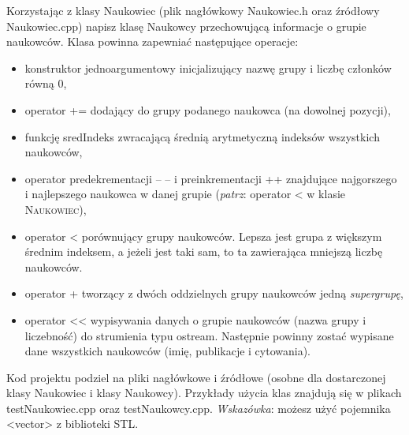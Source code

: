 \documentclass[12pt]{article}
\begin{document}
Korzystając z klasy \textsf{Naukowiec} (plik nagłówkowy \textsf{Naukowiec.h} oraz źródłowy \textsf{Naukowiec.cpp}) napisz klasę \textsf{Naukowcy} przechowującą informacje o grupie naukowców. Klasa powinna zapewniać następujące operacje:
\begin{itemize}
\item konstruktor jednoargumentowy inicjalizujący nazwę grupy i liczbę członków równą 0,
\item operator \textsf{+=} dodający do grupy podanego naukowca (na dowolnej pozycji),
\item funkcję \textsf{sredIndeks} zwracającą średnią arytmetyczną indeksów wszystkich naukowców,
\item operator predekrementacji \textsf{--} \textsf{--} i preinkrementacji \textsf{++} znajdujące najgorszego i najlepszego naukowca w danej grupie (\textit{patrz}: operator \textsf{<} w klasie \textsc{Naukowiec}),
\item operator \textsf{<} porównujący grupy naukowców. Lepsza jest grupa z większym średnim indeksem, a jeżeli jest taki sam, to ta zawierająca mniejszą liczbę naukowców.
\item operator \textsf{+} tworzący z dwóch oddzielnych grupy naukowców jedną \textit{supergrupę},
\item operator \textsf{<<} wypisywania danych o grupie naukowców (nazwa grupy i liczebność) do strumienia typu \textsf{ostream}. Następnie powinny zostać wypisane dane wszystkich naukowców (imię, publikacje i cytowania).
\end{itemize}
Kod projektu podziel na pliki nagłówkowe i źródłowe (osobne dla dostarczonej klasy \textsf{Naukowiec} i klasy \textsf{Naukowcy}). Przykłady użycia klas znajdują się w plikach \textsf{testNaukowiec.cpp} oraz \textsf{testNaukowcy.cpp}. \textit{Wskazówka}: możesz użyć pojemnika \textsf{<vector>} z biblioteki STL.
\end{document}
